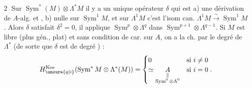\textcircled{2} Sur $\operatorname{Sym}^*(M)\otimes\Lambda^*M$  il y a un unique opérateur $\delta$ qui est  a) une dérivation  de $A$-alg.  et , b) nulle sur  $\operatorname{Sym}^1M$, et sur $\Lambda^1M$ c'est l'isom can. $\Lambda^1M\xrightarrow{\sim}\operatorname{Sym}^1M$. Alors $\delta$ satisfait $\delta^2=0$, il applique $\operatorname{Sym}^p\otimes\Lambda^q$ dans $\operatorname{Sym}^{p+1}\otimes\Lambda^{q-1}$. Si $M$ est libre (plus gén., plat) et sans condition de car. sur $A$, on a   la ch. par le degré de $\Lambda^*$  (de sorte que $\delta$ est de degré ) :
\[
H^{\mathrm{Kos}}_{\unsure{q|i}}(\operatorname{Sym}^*M\otimes\Lambda^*(M))=
\begin{cases}0&\text{si }i\neq0\\
\simeq\underset{\substack{\Vert\\\operatorname{Sym}^0\otimes\Lambda^0}}{A}&\text{si }i=0
\end{cases}.
\]
